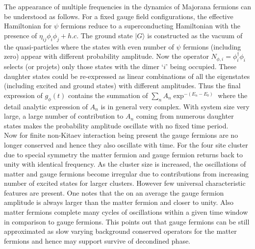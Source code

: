 \documentclass[aps,amsmath,twocolumn,amssymb,floatfix,showpacs,superscriptaddress,nofootinbib,longbibliography]{revtex4-1}
\begin{document}
\indent
The appearance of multiple frequencies in the dynamics of Majorana fermions can be understood as follows. For a fixed gauge field configurations, the effective Hamiltonian for $\psi$ fermions reduce to a superconducting Hamiltonian with the presence of $ \eta_{ij} \phi_i \phi_j + h.c$. The ground state $|G \rangle$ is constructed as the vacuum of the quasi-particles where the states with even number of $\psi$ fermions (including zero) appear with different probability amplitude. Now the operator $N_{\phi,i}= \phi^{\dagger}_i \phi_i$ selects (or projets) only those states  with the dimer `$i$' being occupied. These daughter states could be re-expressed as linear combinations of all the eigenstates (including excited and ground states) with different amplitudes. Thus the final expression of  $g_{\phi}(t)$ contains the summation of $ \sum_{n} A_{n}\exp^{-(E_n-E_0)}$ where the detail analytic expression of $A_n$ is in general very complex. With system size very large, a large number of contribution to $A_{n}$ coming from numerous daughter states makes the probability amplitude oscillate with no fixed time period. \\
\indent
Now for finite non-Kitaev interaction being present the gauge fermions are no longer conserved and hence they also oscillate with time. For the four site cluster due to special symmetry the matter fermion and gauge fermion returns back to unity with identical frequency.  As the cluster size is increased, the oscillations of matter and gauge fermions become  irregular  due to contributions from increasing number of excited states for larger clusters. However few universal characteristic features are present. One notes that the on an average  the gauge fermion amplitude is always larger than the matter fermion and closer to unity. Also matter fermions complete many cycles of oscillations within a given time window in comparison to gauge fermions. This points out that gauge fermions can be still approximated as slow varying background conserved operators for the matter fermions  and hence may support survive of decondined phase. \\
\end{document}
